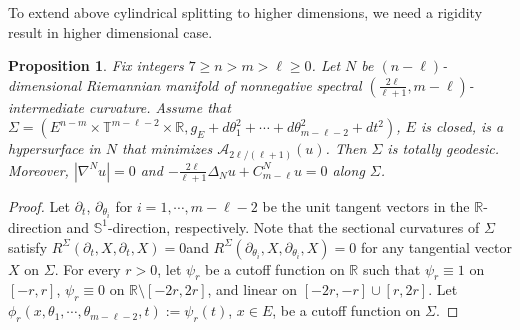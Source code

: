 \documentclass[11pt,letterpaper]{amsart}
\newtheorem{proposition}[theorem]{Proposition}
\theoremstyle{definition}
\theoremstyle{remark}
\numberwithin{equation}{section}
\begin{document}
To extend above cylindrical splitting to higher dimensions, we need a rigidity result in higher dimensional case.
\begin{proposition}\label{rigidity of Cm in higher dimension}
   Fix integers $7\geq n>m>\ell\geq 0$. Let $N$ be $(n-\ell)$-dimensional Riemannian manifold of nonnegative spectral $(\frac{2\ell}{\ell+1},m-\ell)$-intermediate curvature. Assume that $\Sigma=(E^{n-m}\times \mathbb{T}^{m-\ell-2}\times \mathbb{R}, g_E+d\theta_1^2+\cdots+d\theta_{m-\ell-2}^2+dt^2)$, $E$ is closed, is a hypersurface in $N$ that minimizes $\mathcal{A}_{2\ell/(\ell+1)}(u)$. Then $\Sigma$ is totally geodesic. Moreover, $|\nabla^N u|=0$ and $-\frac{2\ell}{\ell+1}\Delta_N u+C_{m-\ell}^Nu= 0$ along $\Sigma$.
\end{proposition}
\begin{proof}
    Let $\partial_t$, $\partial_{\theta_i}$ for $i=1,\cdots,m-\ell-2$   be the unit tangent vectors in the $\mathbb{R}$-direction and $\mathbb{S}^1$-direction, respectively. Note that the sectional curvatures of $\Sigma$ satisfy $R^\Sigma(\partial_t,X,\partial_t,X)=0$and $R^\Sigma(\partial_{\theta_i},X,\partial_{\theta_i},X)=0$ for any tangential vector $X$ on $\Sigma$. For every $r>0$, let $\psi_r$ be a cutoff function on $\mathbb{R}$ such that $\psi_r\equiv 1$ on $[-r,r]$, $\psi_r\equiv 0$ on $\mathbb{R}\setminus [-2r,2r]$, and linear on  $[-2r,-r]\cup [r,2r]$. Let $\phi_r(x,\theta_1,\cdots,\theta_{m-\ell-2},t):=\psi_r(t)$, $x\in E$, be a cutoff function on $\Sigma$.   


\end{proof}
\end{document}
